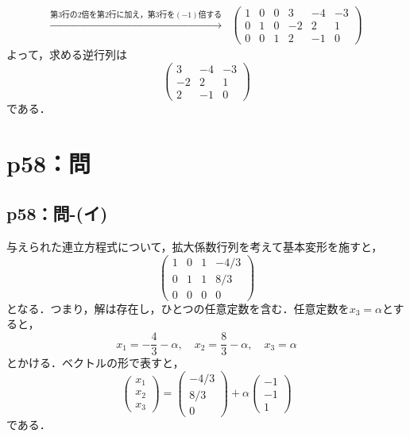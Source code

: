 \documentclass[a4paper,10pt,fleqn]{ltjsarticle}
\begin{document}
\begin{tleftbar}
\begin{align*}
    \xrightarrow{\text{第$3$行の$2$倍を第$2$行に加え，第$3$行を$(-1)$倍する}}            &
    \left( \begin{array}{ccc|ccc}
               1 & 0 & 0 & 3  & -4 & -3 \\
               0 & 1 & 0 & -2 & 2  & 1  \\
               0 & 0 & 1 & 2  & -1 & 0
             \end{array}
    \right)
  \end{align*}
  よって，求める逆行列は
  \[
    \begin{pmatrix}
      3  & -4 & -3 \\
      -2 & 2  & 1  \\
      2  & -1 & 0
    \end{pmatrix}
  \]
  である．
\end{tleftbar}

\newpage


\section*{p58：問}

\subsection*{p58：問-(イ)}

\begin{tleftbar}
  与えられた連立方程式について，拡大係数行列を考えて基本変形を施すと，
  \[
    \begin{pmatrix} 1 & 0 & 1 & -4/3 \\ 0 & 1 & 1 & 8/3 \\ 0 & 0 & 0 & 0 \end{pmatrix}
  \]
  となる．つまり，解は存在し，ひとつの任意定数を含む．任意定数を$ x_3 =\alpha$とすると，
  \[
    x_1 = -\frac{4}{3} - \alpha,\quad x_2 = \frac{8}{3} - \alpha,\quad x_3 = \alpha
  \]
  とかける．ベクトルの形で表すと，
  \[
    \begin{pmatrix} x_1 \\ x_2 \\ x_3 \end{pmatrix} = \begin{pmatrix} -4/3 \\ 8/3 \\ 0 \end{pmatrix} + \alpha \begin{pmatrix} -1 \\ -1 \\ 1 \end{pmatrix}
  \]
  である．
\end{tleftbar}
\end{document}
